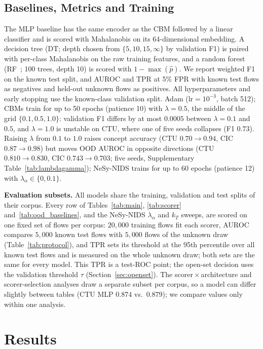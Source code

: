\documentclass[journal]{IEEEtran}
\begin{document}
\subsection{Baselines, Metrics and Training}
\label{sec:eval}

The MLP baseline has the same encoder as the CBM followed by a linear classifier and is scored with Mahalanobis on its 64-dimensional embedding. A decision tree (DT; depth chosen from $\{5,10,15,\infty\}$ by validation F1) is paired with per-class Mahalanobis on the raw training features, and a random forest (RF~\cite{breiman2001random}; 100 trees, depth 10) is scored with $1{-}\max(\hat{p})$. We report weighted F1 on the known test split, and AUROC and TPR at 5\% FPR with known test flows as negatives and held-out unknown flows as positives. All hyperparameters and early stopping use the known-class validation split. Adam ($\mathrm{lr}{=}10^{-3}$, batch 512); CBMs train for up to 50 epochs (patience 10) with $\lambda{=}0.5$, the middle of the grid $\{0.1,0.5,1.0\}$: validation F1 differs by at most $0.0005$ between $\lambda{=}0.1$ and $0.5$, and $\lambda{=}1.0$ is unstable on CTU, where one of five seeds collapses (F1 $0.73$). Raising $\lambda$ from $0.1$ to $1.0$ raises concept accuracy (CTU $0.70{\to}0.94$, CIC $0.87{\to}0.98$) but moves OOD AUROC in opposite directions (CTU $0.810{\to}0.830$, CIC $0.743{\to}0.703$; five seeds, Supplementary Table~\ref{tab:lambdagamma}); NeSy-NIDS trains for up to 60 epochs (patience 12) with $\lambda_\alpha\in\{0,0.1\}$.

\textbf{Evaluation subsets.} All models share the training, validation and test splits of their corpus. Every row of Tables~\ref{tab:main}, \ref{tab:scorer} and~\ref{tab:ood_baselines}, and the NeSy-NIDS $\lambda_\alpha$ and $k_T$ sweeps, are scored on one fixed set of flows per corpus: $20{,}000$ training flows fit each scorer, AUROC compares $5{,}000$ known test flows with $5{,}000$ flows of the unknown draw (Table~\ref{tab:protocol}), and TPR sets its threshold at the 95th percentile over all known test flows and is measured on the whole unknown draw; both sets are the same for every model. This TPR is a test-ROC point; the open-set decision uses the validation threshold $\tau$ (Section~\ref{sec:openset}). The scorer\,$\times$\,architecture and scorer-selection analyses draw a separate subset per corpus, so a model can differ slightly between tables (CTU MLP $0.874$ vs.\ $0.879$); we compare values only within one analysis.

\section{Results}
\end{document}
